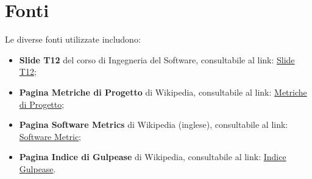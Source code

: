 \section{Fonti}
Le diverse fonti utilizzate includono:
\begin{itemize}
    \item \textbf{Slide T12} del corso di Ingegneria del Software, consultabile al link: \href{https://www.math.unipd.it/~tullio/IS-1/2022/Dispense/T12.pdf}{Slide T12};
    \item \textbf{Pagina Metriche di Progetto} di Wikipedia, consultabile al link: \href{https://it.wikipedia.org/wiki/Metriche_di_progetto}{Metriche di Progetto};
    \item \textbf{Pagina Software Metrics} di Wikipedia (inglese), consultabile al link: \href{https://en.wikipedia.org/wiki/Software_metric}{Software Metric};
    \item \textbf{Pagina Indice di Gulpease} di Wikipedia, consultabile al link: \href{https://it.wikipedia.org/wiki/Indice_Gulpease}{Indice Gulpease}.
\end{itemize}
